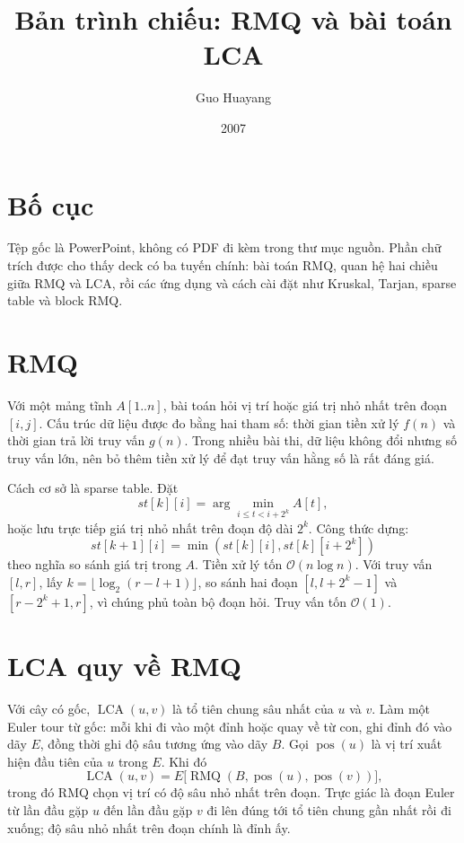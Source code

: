 \documentclass[11pt]{article}
\title{Bản trình chiếu: RMQ và bài toán LCA}
\author{Guo Huayang}
\date{2007}
\newcommand{\Oh}{\mathcal{O}}
\newcommand{\RMQ}{\operatorname{RMQ}}
\newcommand{\LCA}{\operatorname{LCA}}
\newcommand{\pos}{\operatorname{pos}}
\begin{document}
\maketitle


\section{Bố cục}

Tệp gốc là PowerPoint, không có PDF đi kèm trong thư mục nguồn. Phần chữ
trích được cho thấy deck có ba tuyến chính: bài toán RMQ, quan hệ hai chiều
giữa RMQ và LCA, rồi các ứng dụng và cách cài đặt như Kruskal, Tarjan,
sparse table và block RMQ.

\section{RMQ}

Với một mảng tĩnh \(A[1..n]\), bài toán  hỏi vị trí
hoặc giá trị nhỏ nhất trên đoạn \([i,j]\). Cấu trúc dữ liệu được đo bằng hai
tham số: thời gian tiền xử lý \(f(n)\) và thời gian trả lời truy vấn \(g(n)\).
Trong nhiều bài thi, dữ liệu không đổi nhưng số truy vấn lớn, nên bỏ thêm
tiền xử lý để đạt truy vấn hằng số là rất đáng giá.

Cách cơ sở là sparse table. Đặt
\[
  st[k][i]=\arg\min_{i\le t<i+2^k} A[t],
\]
hoặc lưu trực tiếp giá trị nhỏ nhất trên đoạn độ dài \(2^k\). Công thức dựng:
\[
  st[k+1][i]=\min(st[k][i],st[k][i+2^k])
\]
theo nghĩa so sánh giá trị trong \(A\). Tiền xử lý tốn \(\Oh(n\log n)\). Với
truy vấn \([l,r]\), lấy \(k=\lfloor\log_2(r-l+1)\rfloor\), so sánh hai đoạn
\([l,l+2^k-1]\) và \([r-2^k+1,r]\), vì chúng phủ toàn bộ đoạn hỏi. Truy vấn
tốn \(\Oh(1)\).

\section{LCA quy về RMQ}

Với cây có gốc, \(\LCA(u,v)\) là tổ tiên chung sâu nhất của \(u\) và \(v\).
Làm một Euler tour từ gốc: mỗi khi đi vào một đỉnh hoặc quay về từ con, ghi
đỉnh đó vào dãy \(E\), đồng thời ghi độ sâu tương ứng vào dãy \(B\). Gọi
\(\pos(u)\) là vị trí xuất hiện đầu tiên của \(u\) trong \(E\). Khi đó
\[
  \LCA(u,v)=E\bigl[\RMQ(B,\pos(u),\pos(v))\bigr],
\]
trong đó RMQ chọn vị trí có độ sâu nhỏ nhất trên đoạn. Trực giác là đoạn
Euler từ lần đầu gặp \(u\) đến lần đầu gặp \(v\) đi lên đúng tới tổ tiên chung
gần nhất rồi đi xuống; độ sâu nhỏ nhất trên đoạn chính là đỉnh ấy.
\end{document}
